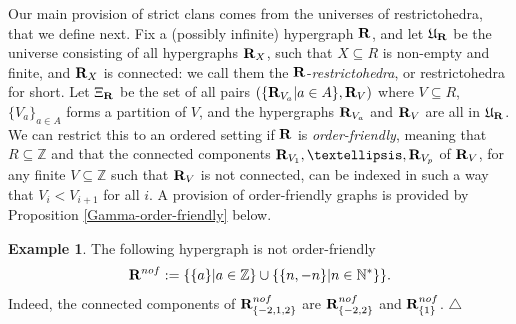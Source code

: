 \documentclass[11pt]{article}
\theoremstyle{definition}
\newtheorem{example}[theo]{Example}
\numberwithin{equation}{section}
\numberwithin{equation}{section}
\newcommand\xqed[1]{%
  \leavevmode\unskip\penalty9999 \hbox{}\nobreak\hfill
  \quad\hbox{#1}}
\newcommand\demo{\xqed{$\triangle$}}
\newcommand{\inc}{\subseteq}
\newcommand{\hyper}[1]{{\bf #1}}
\newcommand{\ZZ}{\mathbb{Z}}
\newcommand{\NN}{\mathbb{N}}
\begin{document}
 Our main provision of strict clans comes from the universes of restrictohedra, that we define next.
Fix a (possibly infinite) hypergraph $\hyper{R}$, and let $\mathfrak{U}_{\hyper{R}}$ be the universe consisting of all hypergraphs $\hyper{R}_X$,   such that $X\inc R$ is non-empty and finite, and  $\hyper{R}_X$ is connected: we call them the $\hyper{R}$-{\em restrictohedra}, or restrictohedra for short. Let $\Xi_\hyper{R}$ be the set of all pairs $\left( \{\hyper{R}_{V_a}|a\in A\}, \hyper{R}_V\right)$
where $V\inc R$,
 $\{V_a\}_{a \in A}$ forms a partition of $V$, and the hypergraphs $\hyper{R}_{V_a}$ and $\hyper{R}_V$ are all in $\mathfrak{U}_\hyper{R}$.
 We can restrict this to an ordered setting if $\hyper{R}$ is {\em order-friendly}, meaning that $R\subseteq\mathbb{Z}$ and that the connected components $\hyper{R}_{V_1},\ldots,\hyper{R}_{V_p}$ of $\hyper{R}_V$, for any finite $V\inc\mathbb{Z}$ such that $\hyper{R}_V$ is not connected, can be indexed in such a way that $V_i<V_{i+1}$ for all $i$.  A provision of order-friendly graphs is provided by Proposition \ref{Gamma-order-friendly} below. 
 
 \begin{example}
 The following hypergraph is not order-friendly
 \begin{equation*}
 \hyper{R}^{nof}:=\{\{a\}|a \in \ZZ \} \cup \{\{n,-n\}|n \in \NN^*\}\}.
 \end{equation*}
 Indeed, the connected components of  $\hyper{R}^{nof}_{\{-2,1,2\}}$ are $\hyper{R}^{nof}_{\{-2,2\}}$ and $\hyper{R}^{nof}_{\{1\}}$. \demo
 \end{example}
 
\end{document}
